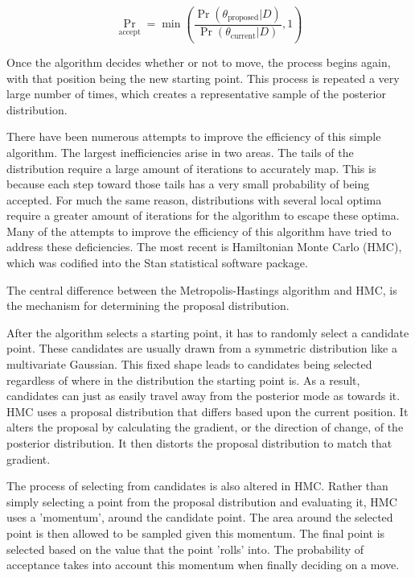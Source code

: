 $$ \Pr_{\text{accept}} = \min\left (\frac{\Pr(\theta_{\text{proposed}}|D)}{\Pr(\theta_{\text{current}}|D)} , 1 \right )$$

Once the algorithm decides whether or not to move, the process begins again, with that position being the new starting point. This process is repeated a very large number of times, which creates a representative sample of the posterior distribution.

There have been numerous attempts to improve the efficiency of this simple algorithm. The largest inefficiencies arise in two areas. The tails of the distribution require a large amount of iterations to accurately map. This is because each step toward those tails has a very small probability of being accepted. For much the same reason, distributions with several local optima require a greater amount of iterations for the algorithm to escape these optima. Many of the attempts to improve the efficiency of this algorithm have tried to address these deficiencies. The most recent is Hamiltonian Monte Carlo (HMC), which was codified into the Stan statistical software package\cite{Carpenter2016}. 

The central difference between the Metropolis-Hastings algorithm and HMC, is the mechanism for determining the proposal distribution\cite{Kruschke2015}. 

After the algorithm selects a starting point, it has to randomly select a candidate point. These candidates are usually drawn from a symmetric distribution like a multivariate Gaussian. This fixed shape leads to candidates being selected regardless of where in the distribution the starting point is. As a result, candidates can just as easily travel away from the posterior mode as towards it. HMC uses a proposal distribution that differs based upon the current position. It alters the proposal by calculating the gradient, or the direction of change, of the posterior distribution. It then distorts the proposal distribution to match that gradient.

The process of selecting from candidates is also altered in HMC. Rather than simply selecting a point from the proposal distribution and evaluating it, HMC uses a 'momentum', around the candidate point. The area around the selected point is then allowed to be sampled given this momentum. The final point is selected based on the value that the point 'rolls' into\cite{Kruschke2015}. The probability of acceptance takes into account this momentum when finally deciding on a move.

